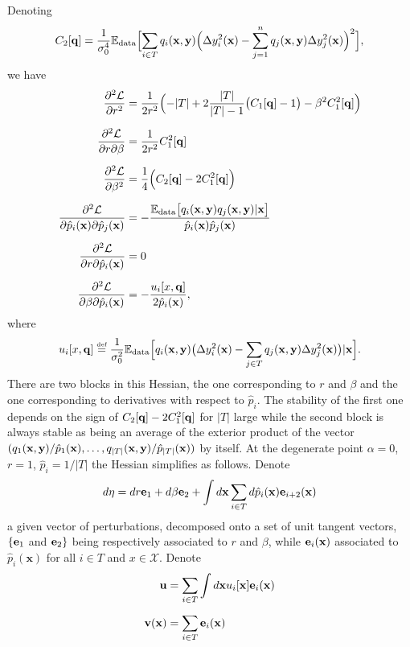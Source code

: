 Denoting
\[
C_2[{\bf q}] = \frac{1}{\sigma_0^4}{\mathbb E}_{\rm data}\Bigl[\sum_{i\in  T} q_i(\mathbf{x},{\bf y})\Bigl(\Delta y_i^2(\mathbf{x})-\sum_{j=1}^n q_j(\mathbf{x},{\bf y})\Delta y_j^2(\mathbf{x})\Bigr)^2\Bigr],
\]
we have
\begin{align*}
\frac{\partial^2 {\cal L}}{\partial r^2} &= \frac{1}{2r^2}\Bigl(-{\vert  T\vert} +2\frac{\vert  T\vert}{\vert  T\vert-1}\bigl(C_1[{\bf q}]-1\bigr)-\beta^2 C_1^2[{\bf q}]\Bigr)\\[0.2cm]
\frac{\partial^2 {\cal L}}{\partial r\partial \beta} &=\frac{1}{2r^2}C_1^2[{\bf q}]\\[0.2cm]
\frac{\partial^2 {\cal L}}{\partial \beta^2} &= \frac{1}{4}\Bigl(C_2[{\bf q}]-2C_1^2[{\bf q}]\Bigr)\\[0.2cm]
\frac{\partial^2 {\cal L}}{\partial \hat p_i(\mathbf{x})\partial\hat p_j(\mathbf{x})}  &= -\frac{{\mathbb E}_{\rm data}\bigl[ q_i(\mathbf{x},{\bf y})q_j(\mathbf{x},{\bf y})\vert \mathbf{x} \bigr]}{\hat p_i(\mathbf{x})\hat p_j(\mathbf{x})}\\[0.2cm]
\frac{\partial^2 {\cal L}}{\partial r\partial\hat p_i(\mathbf{x})} &= 0\\[0.2cm]
\frac{\partial^2 {\cal L}}{\partial \beta\partial\hat p_i(\mathbf{x})} &= -\frac{u_i[x,{\bf q}]}{2\hat p_i(\mathbf{x})},
\end{align*}
where
\[
u_i[x,{\bf q}] \stackrel{\mbox{\upshape\tiny def}}{=} \frac{1}{\sigma_0^2}{\mathbb E}_{\rm data}
\Bigl[ q_i(\mathbf{x},{\bf y})\bigl(\Delta y_i^2(\mathbf{x})-\sum_{j\in  T} q_j(\mathbf{x},{\bf y})\Delta y_j^2(\mathbf{x})\bigr)\vert \mathbf{x} \Bigr].
\]
There are two blocks in this Hessian, the one corresponding to $r$ and $\beta$ and the one corresponding to derivatives with respect to $\hat p_i$.
The stability of the first one depends on the sign of $C_2[{\bf q}]-2C_1^2[{\bf q}]$ for $\vert  T\vert$ large while the second block
is always stable as being an average of the exterior product of the vector $(q_1(\mathbf{x},{\bf y})/\hat p_1(\mathbf{x}),\ldots,q_{\vert  T\vert}(\mathbf{x},{\bf y})/\hat p_{\vert  T\vert}(\mathbf{x}))$
by itself. At the degenerate point $\alpha=0$, $r=1$, $\hat  p_i=1/\vert  T\vert$ the Hessian simplifies as follows. Denote
\[
{d{\bf \eta}} = dr{\bf e}_1+d\beta{\bf e}_2+\int d\mathbf{x}\sum_{i\in  T} d\hat p_i(\mathbf{x}){\bf e}_{i+2}(\mathbf{x})
\]
a given vector of perturbations, decomposed onto a set of unit tangent vectors, $\{{\bf e}_1$ and ${\bf e}_2\}$ being respectively associated to $r$ and $\beta$, while ${\bf e}_i(\mathbf{x})$ associated to $\hat p_i(\mathbf{x})$ for all $i\in T$ and $x\in{\mathcal X}$. 
Denote
\begin{align*}
{\bf u} &= \sum_{i\in  T} \int d\mathbf{x} u_i[\mathbf{x}] {\bf e}_i(\mathbf{x})\\[0.2cm]    
{\bf v}(\mathbf{x}) &= \sum_{i\in  T}  {\bf e}_i(\mathbf{x})
\end{align*}
